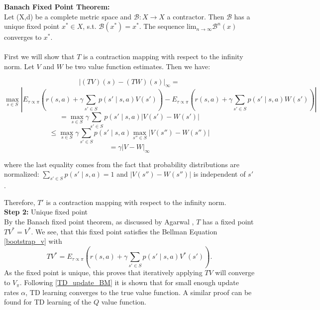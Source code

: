 \textbf{Banach Fixed Point Theorem:}\\
Let (X,d) be a complete metric space and $\mathcal{B}:X \rightarrow X$ a contractor. 
Then $\mathcal{B}$ has a unique fixed point $x^* \in X$, s.t. $\mathcal{B}(x^*) = x^*$. The sequence $\text{lim}_{n \rightarrow \infty}\mathcal{B}^n(x)$ converges to $x^*$.\\ \\

First we will show that $T$ is a contraction mapping with respect to the infinity norm. Let $V$ and $W$ be two value function estimates. Then we have:

\begin{equation}
    |(TV)(s) - (TW)(s)|_\infty =  
\end{equation}
\begin{equation*}
    \max_{s \in S}\left|E_{\tau \propto \pi}\left(r(s,a) + \gamma \sum_{s' \in S} p(s' \mid s,a) V(s')\right) -E_{\tau \propto \pi}\left(r(s,a) + \gamma \sum_{s' \in S} p(s' \mid s,a) W(s')\right)\right| 
\end{equation*}
\begin{equation*}
    = \max_{s \in S}\gamma \sum_{s' \in S} p(s' \mid s,a) |V(s') - W(s')| 
\end{equation*}
\begin{equation*}
    \leq \max_{s \in S}\gamma \sum_{s' \in S} p(s' \mid s,a) \max_{s'' \in S}|V(s'') - W(s'')| 
\end{equation*}
\begin{equation*}
    = \gamma |V - W|_\infty
\end{equation*}

where the last equality comes from the fact that probability distributions are normalized: $\sum_{s' \in S} p(s' \mid s,a) = 1$ and 
$|V(s'') - W(s'')|$ is independent of $s'$.

Therefore, $T'$ is a contraction mapping with respect to the infinity norm. \\

\textbf{Step 2:} Unique fixed point\\
By the Banach fixed point theorem, as discussed by Agarwal \etAl \cite{agarwal2018banach}, $T$ has a fixed point $TV^* = V^*$. 
We see, that this fixed point satisfies the Bellman Equation \ref{bootstrap_v} with 
$$TV^* = E_{\tau \propto \pi} \left(r(s,a) + \gamma \sum_{s' \in S} p(s' \mid s,a) V^*(s')\right).$$
As the fixed point is unique, this proves that iteratively applying $TV$ will converge to $V_{\pi}$. Following \ref{TD_update_BM} it is shown that for small enough 
update rates $\alpha$, TD learning converges to the true value function. A similar proof can be found for TD learning of the $Q$ value function.



